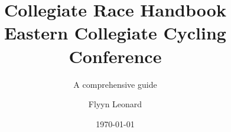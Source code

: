 \documentclass[
  letterpaper, %
  fontsize=10pt, %
  twoside=true,
  chapterentrydots=true, %
  numbers=noenddot,
  fontmethod=tex,
]{kaobook}
\begin{document}

\title[ECCC Race Handbook]{
  Collegiate Race Handbook \\
  Eastern Collegiate Cycling Conference
}
\subtitle{A comprehensive guide}

\author{Flyyn Leonard}
\date{\today}

\publishers{Northeast Collegiate Cycling Corporation}


\frontmatter


\maketitle



\begingroup
\setlength{\textheight}{230\hscale} %

\etocstandarddisplaystyle
\etocstandardlines

\tableofcontents

\listofregulations

\listoffigures



\endgroup

\mainmatter
{}






\end{document}
